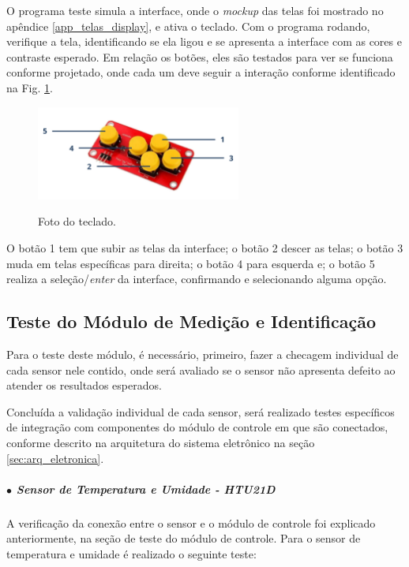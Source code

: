 O programa teste simula a interface, onde o \textit{mockup} das telas foi mostrado no apêndice \ref{app_telas_display}, e ativa o teclado. Com o programa rodando, verifique a tela, identificando se ela ligou e se apresenta a interface com as cores e contraste esperado. Em relação os botões, eles são testados para ver se funciona conforme projetado, onde cada um deve seguir a interação conforme identificado na Fig. \ref{fig:botoes_identificados}.

\begin{figure}[H]
    \centering
    {\includegraphics[width=0.6\textwidth]{figuras/eletronica/fotos_componentes/num_teclado.png}}
    \caption{Foto do teclado.} %
    \label{fig:botoes_identificados}
\end{figure}

O botão 1 tem que subir as telas da interface; o botão 2 descer as telas; o botão 3 muda em telas específicas para direita; o botão 4 para esquerda e; o botão 5 realiza a seleção/\textit{enter} da interface, confirmando e selecionando alguma opção. 

\subsection{Teste do Módulo de Medição e Identificação}

Para o teste deste módulo, é necessário, primeiro, fazer a checagem individual de cada sensor nele contido, onde será avaliado se o sensor não apresenta defeito ao atender os resultados esperados.

Concluída a validação individual de cada sensor, será realizado testes específicos de integração com componentes do módulo de controle em que são conectados, conforme descrito na arquitetura do sistema eletrônico na seção \ref{sec:arq_eletronica}.

\subparagraph*{$\bullet$ Sensor de Temperatura e Umidade - HTU21D} \hfill

A verificação da conexão entre o sensor e o módulo de controle foi explicado anteriormente, na seção de teste do módulo de controle. Para o sensor de temperatura e umidade é realizado o seguinte teste:

